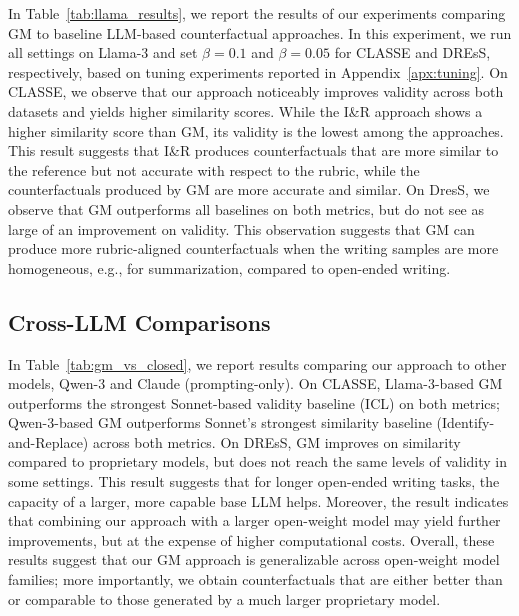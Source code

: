 \documentclass[11pt]{article}
\begin{document}
In Table~\ref{tab:llama_results}, we report the results of our experiments comparing GM to baseline LLM-based counterfactual approaches. In this experiment, we run all settings on Llama-3 and set $\beta=0.1$ and $\beta=0.05$ for CLASSE and DREsS, respectively, based on tuning experiments reported in Appendix~\ref{apx:tuning}. On CLASSE, we observe that our approach noticeably improves validity across both datasets and yields higher similarity scores. While the I\&R approach shows a higher similarity score than GM, its validity is the lowest among the approaches. This result suggests that I\&R produces counterfactuals that are more similar to the reference but not accurate with respect to the rubric, while the counterfactuals produced by GM are more accurate and similar. On DresS, we observe that GM outperforms all baselines on both metrics, but do not see as large of an improvement on validity. This observation suggests that GM can produce more rubric-aligned counterfactuals when the writing samples are more homogeneous, e.g., for summarization, compared to open-ended writing. 



\subsection{Cross-LLM Comparisons}

In Table~\ref{tab:gm_vs_closed}, we report results comparing our approach to other models, Qwen-3 and Claude (prompting-only). 
On CLASSE, Llama-3-based GM outperforms the strongest Sonnet-based validity baseline (ICL) on both metrics; Qwen-3-based GM outperforms Sonnet's strongest similarity baseline (Identify-and-Replace) across both metrics. On DREsS, GM improves on similarity compared to proprietary models, but does not reach the same levels of validity in some settings. This result suggests that for longer open-ended writing tasks, the capacity of a larger, more capable base LLM helps. 
Moreover, the result indicates that combining our approach with a larger open-weight model may yield further improvements, but at the expense of higher computational costs. Overall, these results suggest that our GM approach is generalizable across open-weight model families; more importantly, we obtain counterfactuals that are either better than or comparable to those generated by a much larger proprietary model.
\end{document}
